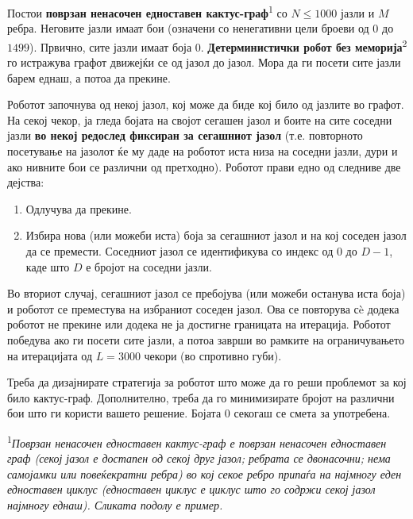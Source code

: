 \documentclass[12pt]{article}
\begin{document}
\renewcommand{\round}{Ден 2}
\renewcommand{\problemName}{Задача Навигација}
\renewcommand{\lang}{Македонски}

\renewcommand{\tl}{$3$ сек.}
\renewcommand{\ml}{$512$ MB}
\problem{\problemName}

Постои \textbf{поврзан ненасочен едноставен кактус-граф}\textsuperscript{1} со $N \leq 1000$ јазли и $M$ ребра. Неговите јазли имаат бои (означени со ненегативни цели броеви од $0$ до $1499$). Првично, сите јазли имаат боја $0$. \textbf{Детерминистички робот без меморија}\textsuperscript{2} го истражува графот движејќи се од јазол до јазол. Мора да ги посети сите јазли барем еднаш, а потоа да прекине.

Роботот започнува од некој јазол, кој може да биде кој било од јазлите во графот. На секој чекор, ја гледа бојата на својот сегашен јазол и боите на сите соседни јазли \textbf{во некој редослед фиксиран за сегашниот јазол} (т.е. повторното посетување на јазолот ќе му даде на роботот иста низа на соседни јазли, дури и ако нивните бои се различни од претходно). Роботот прави едно од следниве две дејства:
\begin{enumerate}
\item Одлучува да прекине.
\item Избира нова (или можеби иста) боја за сегашниот јазол и на кој соседен јазол да се премести. Соседниот јазол се идентификува со индекс од $0$ до $D-1$, каде што $D$ е бројот на соседни јазли.
\end{enumerate}

Во вториот случај, сегашниот јазол се пребојува (или можеби останува иста боја) и роботот се преместува на избраниот соседен јазол. Ова се повторува сè додека роботот не прекине или додека не ја достигне границата на итерација. Роботот победува ако ги посети сите јазли, а потоа заврши во рамките на ограничувањето на итерацијата од $L = 3000$ чекори (во спротивно губи).

Треба да дизајнирате стратегија за роботот што може да го реши проблемот за кој било кактус-граф. Дополнително, треба да го минимизирате бројот на различни бои што ги користи вашето решение. Бојата 0 секогаш се смета за употребена.

\textsuperscript{1}\textit{Поврзан ненасочен едноставен кактус-граф е поврзан ненасочен едноставен граф (секој јазол е достапен од секој друг јазол; ребрата се двонасочни; нема самојамки или повеќекратни ребра) во кој секое ребро припаѓа на најмногу еден едноставен циклус (едноставен циклус е циклус што го содржи секој јазол најмногу еднаш). Сликата подолу е пример.}
\end{document}
